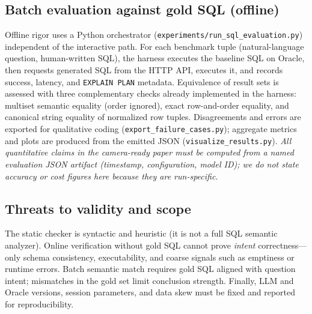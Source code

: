 \subsection{Batch evaluation against gold SQL (offline)}
Offline rigor uses a Python orchestrator (\texttt{experiments/run\_sql\_evaluation.py}) independent of the interactive path.
For each benchmark tuple (natural-language question, human-written SQL), the harness executes the baseline SQL on Oracle, then requests generated SQL from the HTTP API, executes it, and records success, latency, and \texttt{EXPLAIN~PLAN} metadata.
Equivalence of result sets is assessed with three complementary checks already implemented in the harness: multiset semantic equality (order ignored), exact row-and-order equality, and canonical string equality of normalized row tuples.
Disagreements and errors are exported for qualitative coding (\texttt{export\_failure\_cases.py}); aggregate metrics and plots are produced from the emitted JSON (\texttt{visualize\_results.py}).
\emph{All quantitative claims in the camera-ready paper must be computed from a named evaluation JSON artifact (timestamp, configuration, model ID); we do not state accuracy or cost figures here because they are run-specific.}

\subsection{Threats to validity and scope}
The static checker is syntactic and heuristic (it is not a full SQL semantic analyzer).
Online verification without gold SQL cannot prove \emph{intent} correctness---only schema consistency, executability, and coarse signals such as emptiness or runtime errors.
Batch semantic match requires gold SQL aligned with question intent; mismatches in the gold set limit conclusion strength.
Finally, LLM and Oracle versions, session parameters, and data skew must be fixed and reported for reproducibility.
